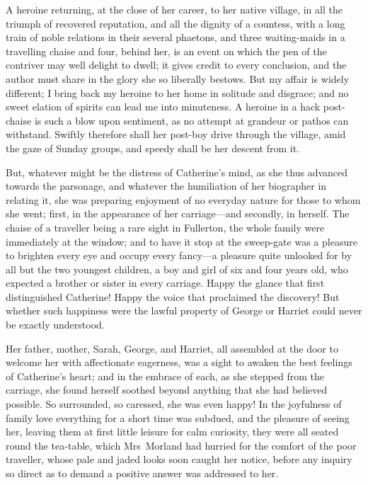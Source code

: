 A heroine returning, at the close of her career, to her native village, in all the triumph of recovered reputation, and all the dignity of a countess, with a long train of noble relations in their several phaetons, and three waiting-maids in a travelling chaise and four, behind her, is an event on which the pen of the contriver may well delight to dwell; it gives credit to every conclusion, and the author must share in the glory she so liberally bestows. But my affair is widely different; I bring back my heroine to her home in solitude and disgrace; and no sweet elation of spirits can lead me into minuteness. A heroine in a hack post-chaise is such a blow upon sentiment, as no attempt at grandeur or pathos can withstand. Swiftly therefore shall her post-boy drive through the village, amid the gaze of Sunday groups, and speedy shall be her descent from it. 

 But, whatever might be the distress of Catherine's mind, as she thus advanced towards the parsonage, and whatever the humiliation of her biographer in relating it, she was preparing enjoyment of no everyday nature for those to whom she went; first, in the appearance of her carriage—and secondly, in herself. The chaise of a traveller being a rare sight in Fullerton, the whole family were immediately at the window; and to have it stop at the sweep-gate was a pleasure to brighten every eye and occupy every fancy—a pleasure quite unlooked for by all but the two youngest children, a boy and girl of six and four years old, who expected a brother or sister in every carriage. Happy the glance that first distinguished Catherine! Happy the voice that proclaimed the discovery! But whether such happiness were the lawful property of George or Harriet could never be exactly understood. 

 Her father, mother, Sarah, George, and Harriet, all assembled at the door to welcome her with affectionate eagerness, was a sight to awaken the best feelings of Catherine's heart; and in the embrace of each, as she stepped from the carriage, she found herself soothed beyond anything that she had believed possible. So surrounded, so caressed, she was even happy! In the joyfulness of family love everything for a short time was subdued, and the pleasure of seeing her, leaving them at first little leisure for calm curiosity, they were all seated round the tea-table, which Mrs~Morland had hurried for the comfort of the poor traveller, whose pale and jaded looks soon caught her notice, before any inquiry so direct as to demand a positive answer was addressed to her. 

